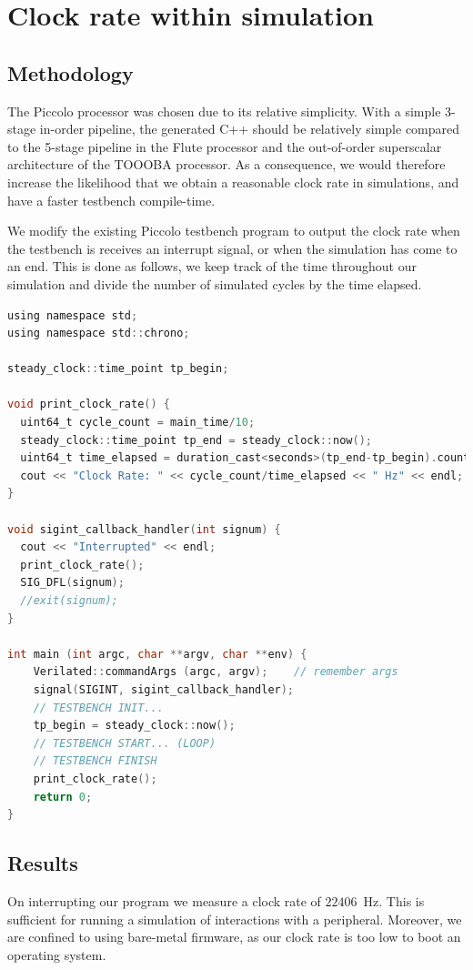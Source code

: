 \documentclass[a4paper,8pt]{report}
\begin{document}
\section{Clock rate within simulation}
\subsection{Methodology}
The Piccolo processor was chosen due to its relative simplicity. With a simple
3-stage in-order pipeline, the generated C++ should be relatively simple
compared to the 5-stage pipeline in the Flute processor and the out-of-order
superscalar architecture of the TOOOBA processor. As a consequence, we would
therefore increase the likelihood that we obtain a reasonable clock rate in
simulations, and have a faster testbench compile-time.

We modify the existing Piccolo testbench program to output the clock rate when
the testbench is receives an interrupt signal, or when the simulation has come
to an end. This is done as follows, we keep track of the time throughout our
simulation and divide the number of simulated cycles by the time elapsed.
\begin{lstlisting}[language=C,style=customc]
using namespace std;
using namespace std::chrono;

steady_clock::time_point tp_begin;

void print_clock_rate() {
  uint64_t cycle_count = main_time/10;
  steady_clock::time_point tp_end = steady_clock::now();
  uint64_t time_elapsed = duration_cast<seconds>(tp_end-tp_begin).count();
  cout << "Clock Rate: " << cycle_count/time_elapsed << " Hz" << endl;
}

void sigint_callback_handler(int signum) {
  cout << "Interrupted" << endl;
  print_clock_rate();
  SIG_DFL(signum);
  //exit(signum);
}

int main (int argc, char **argv, char **env) {
    Verilated::commandArgs (argc, argv);    // remember args
    signal(SIGINT, sigint_callback_handler);
    // TESTBENCH INIT...
    tp_begin = steady_clock::now();
    // TESTBENCH START... (LOOP)
    // TESTBENCH FINISH
    print_clock_rate();
    return 0;
}
\end{lstlisting}


\subsection{Results}
On interrupting our program we measure a clock rate of $22406$~Hz. This is
sufficient for running a simulation of interactions with a peripheral. Moreover,
we are confined to using bare-metal firmware, as our clock rate is too low to
boot an operating system.
\end{document}

